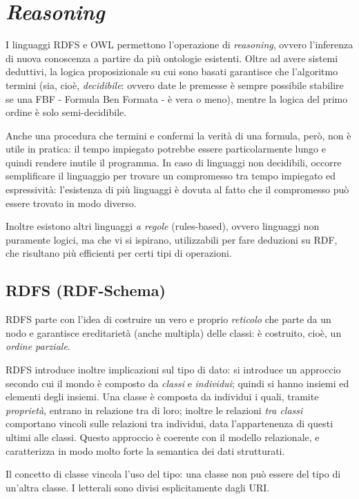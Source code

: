 \documentclass[11pt]{article}
\begin{document}
\section{\textit{Reasoning}}
I linguaggi RDFS e OWL permettono l'operazione di \textit{reasoning}, ovvero l'inferenza di nuova conoscenza a partire da più ontologie esistenti.
Oltre ad avere sistemi deduttivi, la logica proposizionale su cui sono basati garantisce che l'algoritmo termini (sia, cioè, \textit{decidibile}: ovvero date le premesse è sempre possibile stabilire se una FBF - Formula Ben Formata - è vera o meno), mentre la logica del primo ordine è solo semi-decidibile.

Anche una procedura che termini e confermi la verità di una formula, però, non è utile in pratica: il tempo impiegato potrebbe essere particolarmente lungo e quindi rendere inutile il programma.
In caso di linguaggi non decidibili, occorre semplificare il linguaggio per trovare un compromesso tra tempo impiegato ed espressività: l'esistenza di più linguaggi è dovuta al fatto che il compromesso può essere trovato in modo diverso.

Inoltre esistono altri linguaggi \textit{a regole} (rules-based), ovvero linguaggi non puramente logici, ma che vi si ispirano, utilizzabili per fare deduzioni su RDF, che risultano più efficienti per certi tipi di operazioni.

\subsection{RDFS (RDF-Schema)}
RDFS parte con l'idea di costruire un vero e proprio \textit{reticolo} che parte da un nodo e garantisce ereditarietà (anche multipla) delle classi: è costruito, cioè, un \textit{ordine parziale}.

RDFS introduce inoltre implicazioni sul tipo di dato: si introduce un approccio secondo cui il mondo è composto da \textit{classi} e \textit{individui}; quindi si hanno insiemi ed elementi degli insiemi.
Una classe è composta da individui i quali, tramite \textit{proprietà}, entrano in relazione tra di loro; inoltre le relazioni \textit{tra classi} comportano vincoli sulle relazioni tra individui, data l'appartenenza di questi ultimi alle classi.
Questo approccio è coerente con il modello relazionale, e caratterizza in modo molto forte la semantica dei dati strutturati.

Il concetto di classe vincola l'uso del tipo: una classe non può essere del tipo di un'altra classe. I letterali sono divisi esplicitamente dagli URI.
\end{document}
